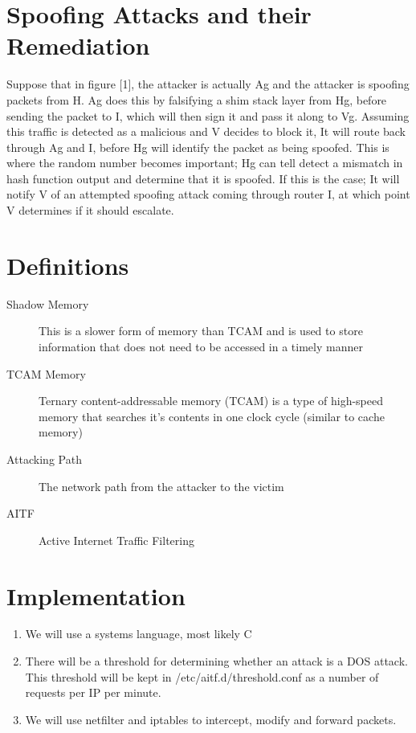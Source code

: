 \documentclass[11pt]{article}
\begin{document}
\section{Spoofing Attacks and their Remediation}
Suppose that in figure [1], the attacker is actually Ag and the attacker is
spoofing packets from H. Ag does this by falsifying a shim stack layer from Hg,
before sending the packet to I, which will then sign it and pass it along to
Vg. Assuming this traffic is detected as a malicious and V decides to block it,
It will route back through Ag and I, before Hg will identify the packet as
being spoofed. This is where the random number becomes important; Hg can tell
detect a mismatch in hash function output and determine that it is spoofed. If
this is the case; It will notify V of an attempted spoofing attack coming
through router I, at which point V determines if it should escalate.

\section{Definitions}
\begin{description}
	\item[Shadow Memory] This is a slower form of memory than TCAM and is used
	to store information that does not need to be accessed in a timely manner
	\item[TCAM Memory] Ternary content-addressable memory (TCAM) is a type of
	high-speed memory that searches it’s contents in one clock cycle
	(similar to cache memory)
	\item[Attacking Path] The network path from the attacker to the victim
	\item[AITF] Active Internet Traffic Filtering
\end{description}

\section{Implementation}
\begin{enumerate}
	\item We will use a systems language, most likely C
	\item There will be a threshold for determining whether an attack is a DOS
	attack. This threshold will be kept in /etc/aitf.d/threshold.conf as a
	number of requests per IP per minute.
	\item We will use netfilter and iptables to intercept, modify and forward
	packets.

\end{enumerate}
\end{document}
